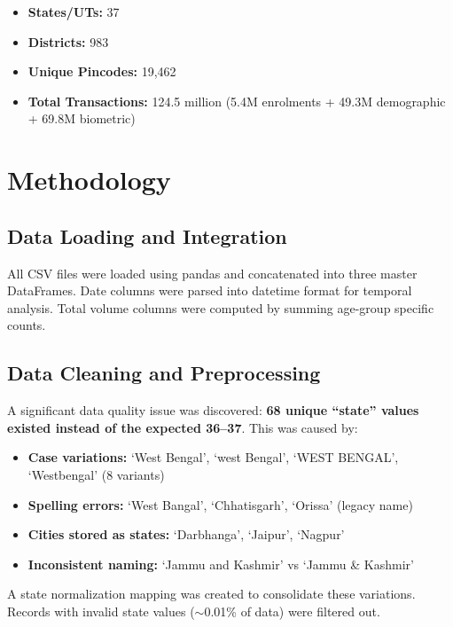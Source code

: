 \documentclass[11pt,a4paper]{article}
\begin{document}
\begin{itemize}
    \item \textbf{States/UTs:} 37
    \item \textbf{Districts:} 983
    \item \textbf{Unique Pincodes:} 19,462
    \item \textbf{Total Transactions:} 124.5 million (5.4M enrolments + 49.3M demographic + 69.8M biometric)
\end{itemize}

\section{Methodology}

\subsection{Data Loading and Integration}

All CSV files were loaded using pandas and concatenated into three master DataFrames. Date columns were parsed into datetime format for temporal analysis. Total volume columns were computed by summing age-group specific counts.

\subsection{Data Cleaning and Preprocessing}

A significant data quality issue was discovered: \textbf{68 unique ``state'' values existed instead of the expected 36--37}. This was caused by:

\begin{itemize}
    \item \textbf{Case variations:} `West Bengal', `west Bengal', `WEST BENGAL', `Westbengal' (8 variants)
    \item \textbf{Spelling errors:} `West Bangal', `Chhatisgarh', `Orissa' (legacy name)
    \item \textbf{Cities stored as states:} `Darbhanga', `Jaipur', `Nagpur'
    \item \textbf{Inconsistent naming:} `Jammu and Kashmir' vs `Jammu \& Kashmir'
\end{itemize}

A state normalization mapping was created to consolidate these variations. Records with invalid state values ($\sim$0.01\% of data) were filtered out.
\end{document}
